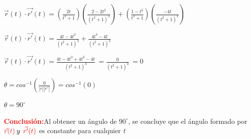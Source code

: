 \documentclass[12pt, letter-paper]{article}
\begin{document}
\begin{enumerate}
    \large{}
    \vspace{0.5cm}
    \large{$\vec{r}(t)\cdot\vec{r'}(t)=\left(\frac{2t}{t^{2}+1}\right)\left(\frac{2-2t^{2}}{(t^{2}+1)^{2}}\right)+\left(\frac{1-t^{2}}{t^{2}+1}\right)\left(\frac{-4t}{(t^{2}+1)^{2}}\right)$}\par
    \vspace{0.5cm}
    \large{$\vec{r}(t)\cdot\vec{r'}(t)=\frac{4t-4t^{3}}{(t^{2}+1)^{3}}+\frac{4t^{3}-4t}{(t^{2}+1)^{3}}$}\par
    \vspace{0.5cm}
    \large{$\vec{r}(t)\cdot\vec{r'}(t)=\frac{4t-4t^{3}+4t^{3}-4t}{(t^{2}+1)^{3}}\: =\frac{0}{(t^{2}+1)^{3}}\:=0$}\par
    \vspace{0.5cm}
    \large{$\theta=cos^{-1}\left( \frac{0}{\left | r \right |\left | r' \right |} \right)  =cos^{-1}\left( 0 \right)$}\par
    \vspace{0.5cm}
    \large{$\theta=90^{\circ}$}\par
    \vspace{0.5cm}
    \normalsize{\textcolor{Red}{\textbf{Conclusión:}\:}Al obtener un ángulo de $90^{\circ}$, se concluye que el ángulo formado por $\textcolor{Red}{\vec{r}(t)\:} y \:\: \textcolor{red}{\vec{r'}(t)}$ es constante para cualquier \textit{t}}
    \vspace{1cm}
    

\end{enumerate}
\end{document}
